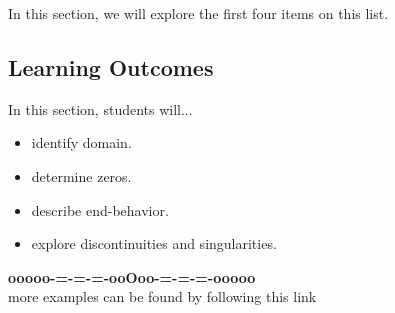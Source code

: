 \documentclass{ximera}
\begin{document}
In this section, we will explore the first four items on this list.









\subsection*{Learning Outcomes}

\begin{sectionOutcomes}
In this section, students will...

\begin{itemize}
\item identify domain.
\item determine zeros.
\item describe end-behavior.
\item explore discontinuities and singularities.
\end{itemize}
\end{sectionOutcomes}



























\begin{onlineOnly}
\begin{center}
\textbf{\textcolor{green!50!black}{ooooo-=-=-=-ooOoo-=-=-=-ooooo}} \\

more examples can be found by following this link\\ 

\end{center}
\end{onlineOnly}
\end{document}
